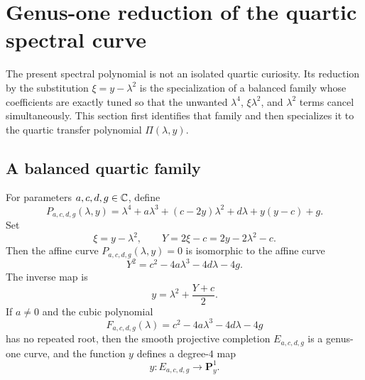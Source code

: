 \section{Genus-one reduction of the quartic spectral curve}\label{sec:genus-one}

The present spectral polynomial is not an isolated quartic curiosity.
Its reduction by the substitution \(\xi=y-\lambda^2\) is the specialization of a balanced family whose coefficients are exactly tuned so that the unwanted \(\lambda^4\), \(\xi\lambda^2\), and \(\lambda^2\) terms cancel simultaneously.
This section first identifies that family and then specializes it to the quartic transfer polynomial \(\Pi(\lambda,y)\).

\subsection{A balanced quartic family}

\begin{proposition}\label{prop:balanced-family}
For parameters \(a,c,d,g\in\mathbb{C}\), define
\begin{equation}\label{eq:balanced-family}
P_{a,c,d,g}(\lambda,y)
=
\lambda^4+a\lambda^3+(c-2y)\lambda^2+d\lambda+y(y-c)+g.
\end{equation}
Set
\begin{equation}\label{eq:balanced-xi}
\xi=y-\lambda^2,
\qquad
Y=2\xi-c=2y-2\lambda^2-c.
\end{equation}
Then the affine curve \(P_{a,c,d,g}(\lambda,y)=0\) is isomorphic to the affine curve
\begin{equation}\label{eq:balanced-weierstrass}
Y^2=c^2-4a\lambda^3-4d\lambda-4g.
\end{equation}
The inverse map is
\begin{equation}\label{eq:balanced-inverse}
y=\lambda^2+\frac{Y+c}{2}.
\end{equation}
If \(a\neq 0\) and the cubic polynomial
\[
F_{a,c,d,g}(\lambda)=c^2-4a\lambda^3-4d\lambda-4g
\]
has no repeated root, then the smooth projective completion \(E_{a,c,d,g}\) is a genus-one curve, and the function \(y\) defines a degree-\(4\) map
\[
y:E_{a,c,d,g}\to\mathbf P^1_y.
\]
\end{proposition}

